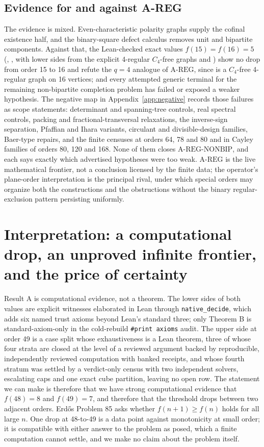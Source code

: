 \documentclass{anvil-paper}
\newcommand{\AREG}{\mathrm{A\text{-}REG}}
\newcommand{\NONBIP}{\mathrm{A\text{-}REG\text{-}NONBIP}}
\theoremstyle{definition}
\begin{document}
\subsection{Evidence for and against A-REG}\label{sec:areg-evidence}

The evidence is mixed. Even-characteristic polarity graphs supply the cofinal existence half, and the binary-square defect calculus removes unit and bipartite components. Against that, the Lean-checked exact values $f(15)=f(16)=5$ (, , with lower sides from the explicit 4-regular $C_4$-free graphs  and ) show no drop from order 15 to 16 and refute the $q=4$ analogue of $\AREG$, since  is a $C_4$-free 4-regular graph on 16 vertices; and every attempted generic terminal for the remaining non-bipartite completion problem has failed or exposed a weaker hypothesis. The negative map in Appendix~\ref{app:negative} records those failures as scope statements: determinant and spanning-tree controls, real spectral controls, packing and fractional-transversal relaxations, the inverse-sign separation, Pfaffian and Ihara variants, circulant and divisible-design families, Baer-type repairs, and the finite censuses at orders 64, 78 and 80 and in Cayley families of orders 80, 120 and 168. None of them closes $\NONBIP$, and each says exactly which advertised hypotheses were too weak. $\AREG$ is the live mathematical frontier, not a conclusion licensed by the finite data; the operator's plane-order interpretation is the principal rival, under which special orders may organize both the constructions and the obstructions without the binary regular-exclusion pattern persisting uniformly.

\section{Interpretation: a computational drop, an unproved infinite frontier, and the price of certainty}\label{sec:interpretation}

Result A is computational evidence, not a theorem. The lower sides of both values are explicit witnesses elaborated in Lean through \texttt{native\_decide}, which adds six named trust axioms beyond Lean's standard three; only Theorem B is standard-axiom-only in the cold-rebuild \texttt{\#print axioms} audit. The upper side at order 49 is a case split whose exhaustiveness is a Lean theorem, three of whose four strata are closed at the level of a reviewed argument backed by reproducible, independently reviewed computation with banked receipts, and whose fourth stratum was settled by a verdict-only census with two independent solvers, escalating caps and one exact cube partition, leaving no open row. The statement we can make is therefore that we have strong computational evidence that $f(48)=8$ and $f(49)=7$, and therefore that the threshold drops between two adjacent orders. Erdős Problem 85 asks whether $f(n+1)\ge f(n)$ holds for all large $n$. One drop at 48-to-49 is a data point against monotonicity at small order; it is compatible with either answer to the problem as posed, which a finite computation cannot settle, and we make no claim about the problem itself.
\end{document}
